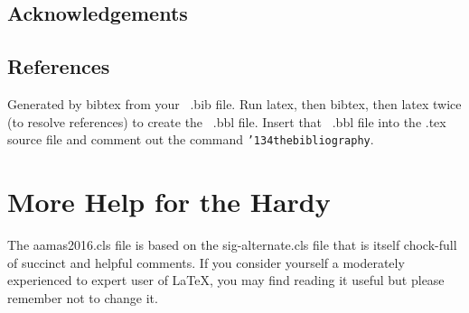 \documentclass{aamas2016}
\begin{document}
\subsection{Acknowledgements}

\subsection{References}

Generated by bibtex from your ~.bib file.  Run latex,
then bibtex, then latex twice (to resolve references)
to create the ~.bbl file.  Insert that ~.bbl file into
the .tex source file and comment out
the command \texttt{{\char'134}thebibliography}.
\section{More Help for the Hardy}
The aamas2016.cls file is based on the sig-alternate.cls file that
is itself chock-full of succinct and helpful comments.  If you
consider yourself a moderately experienced to expert user of
\LaTeX, you may find reading it useful but please remember not to
change it.
%
%

%
\end{document}
